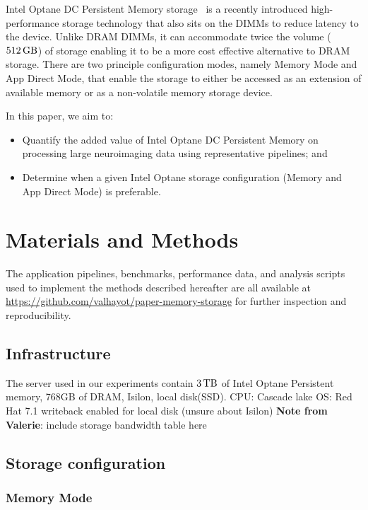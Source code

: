 \documentclass[conference]{IEEEtran}
\newcommand{\valerie}[1]{\color{blue}\textbf{Note from Valerie}:
      #1 \color{black}}
\begin{document}
Intel Optane DC Persistent Memory storage~\cite{optanebrief} is a recently introduced high-performance
storage technology that also sits on the DIMMs to reduce latency to the device.
Unlike DRAM DIMMs, it can accommodate twice the volume ($\SI{512}{\giga\byte}$) of
storage enabling it to be a more cost effective alternative to DRAM storage.
There are two principle configuration modes, namely Memory Mode and App Direct Mode,
that enable the storage to either be accessed as an extension of available memory 
or as a non-volatile memory storage device.


In this paper, we aim to:
\begin{itemize}
        \item Quantify the added value of Intel Optane DC Persistent Memory on 
            processing large neuroimaging data using representative pipelines; and
        \item Determine when a given Intel Optane storage configuration (Memory 
            and App Direct Mode) is preferable.
\end{itemize}

\section{Materials and Methods}
The application pipelines, benchmarks, performance data, and analysis scripts used 
to implement the methods described hereafter are all available at 
\url{https://github.com/valhayot/paper-memory-storage} for 
further inspection and reproducibility.

\subsection{Infrastructure}

The server used in our experiments contain $\SI{3}{\tera\byte}$ of Intel Optane Persistent memory, 768GB of DRAM,
Isilon, local disk(SSD).
CPU: Cascade lake
OS: Red Hat 7.1
writeback enabled for local disk (unsure about Isilon)
\valerie{include storage bandwidth table here}

\subsection{Storage configuration}

\subsubsection{Memory Mode}
\end{document}
